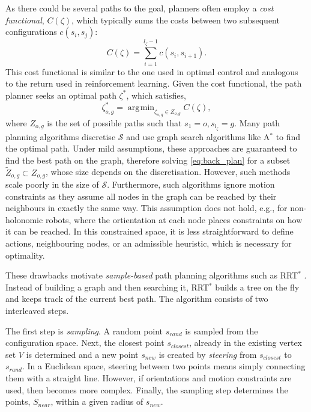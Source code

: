 \documentclass[letterpaper, 10 pt, conference]{ieeeconf}
\DeclareMathOperator*{\argmin}{\arg\!\min}
\begin{document}
As there could be several paths to the goal, planners often employ a \emph{cost functional}, $C(\zeta)$, which typically sums the costs between two subsequent configurations $c(s_i,s_j)$:
\begin{equation}
	C(\zeta) = \sum_{i=1}^{l_{\zeta}-1} c(s_i,s_{i+1}).
\end{equation}
This cost functional is similar to the one used in optimal control and analogous to the return used in reinforcement learning. Given the cost functional, the path planner seeks an optimal path $\zeta^*$, which satisfies,
\begin{equation}
 	\zeta^*_{o,g} = \argmin_{\zeta_{o,g} \in Z_{o,g}} C(\zeta), \label{eq:back_plan}
\end{equation}
where $Z_{o,g}$ is the set of possible paths such that $s_1 = o, s_{l_\zeta} = g$. Many path planning algorithms discretise $\mathcal{S}$ and use graph search algorithms like A$^*$ to find the optimal path. Under mild assumptions, these approaches are guaranteed to find the best path on the graph, therefore solving \eqref{eq:back_plan} for a subset $\tilde{Z}_{o,g} \subset Z_{o,g}$, whose size depends on the discretisation. However, such methods scale poorly in the size of $\mathcal{S}$. Furthermore, such algorithms ignore motion constraints as they assume all nodes in the graph can be reached by their neighbours in exactly the same way. This assumption does not hold, e.g., for non-holonomic robots, where the ortientation at each node places constraints on how it can be reached. In this constrained space, it is less straightforward to define actions, neighbouring nodes, or an admissible heuristic, which is necessary for optimality.

These drawbacks motivate \emph{sample-based} path planning algorithms such as RRT$^*$  \cite{karaman2011sampling}. Instead of building a graph and then searching it, RRT$^*$ builds a tree on the fly and keeps track of the current best path. The algorithm consists of two interleaved steps. 

The first step is \emph{sampling}. A random point $s_{rand}$ is sampled from the configuration space. Next, the closest point $s_{closest}$, already in the existing vertex set $V$ is determined and a new point $s_{new}$ is created by \emph{steering} from  $s_{closest}$ to $s_{rand}$. In a Euclidean space, steering between two points means simply connecting them with a straight line. However, if orientations and motion constraints are used, then becomes more complex. Finally, the sampling step determines the points, $S_{near}$, within a given radius of $s_{new}$.
\end{document}
